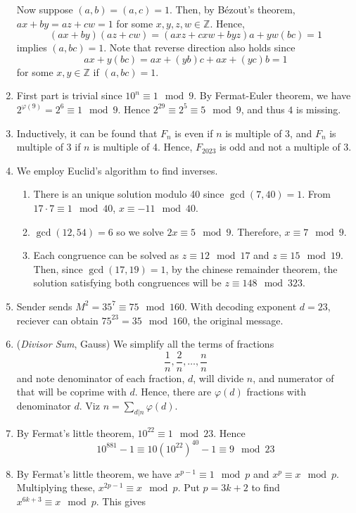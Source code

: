 \documentclass[10pt, a4paper, twoside]{report}
\begin{document}
\begin{enumerate}[{1.}]
    Now suppose \((a,b)=(a,c)=1\). Then, by Bézout's theorem, \(ax+by=az+cw=1\) for some \(x,y,z,w\in\mathbb{Z}\). Hence,
    \[(ax+by)(az+cw)=(axz+cxw+byz)a+yw(bc)=1\]
    implies \((a,bc)=1\). Note that reverse direction also holds since 
    \[ax+y(bc)=ax+(yb)c+ax+(yc)b=1\]
    for some \(x,y\in\mathbb{Z}\) if \((a,bc)=1\).
    \item First part is trivial since \(10^n\equiv 1\mod 9\). By Fermat-Euler theorem, we have \(2^{\varphi(9)}=2^6\equiv 1\mod 9\). Hence \(2^{29}\equiv 2^5\equiv 5\mod 9\), and thus \(4\) is missing.
    \item Inductively, it can be found that \(F_n\) is even if \(n\) is multiple of 3, and \(F_n\) is multiple of 3 if \(n\) is multiple of 4. Hence, \(F_{2023}\) is odd and not a multiple of 3.
    \item We employ Euclid's algorithm to find inverses.
    \begin{enumerate}
        \item There is an unique solution modulo 40 since \(\gcd(7,40)=1\). From \(17\cdot 7\equiv 1\mod 40\), \(x\equiv -11\mod 40\).
        \item \(\gcd(12,54)=6\) so we solve \(2x\equiv 5\mod 9\). Therefore, \(x\equiv 7\mod 9\). 
        \item Each congruence can be solved as \(z\equiv 12\mod 17\) and \(z\equiv 15\mod 19\). Then, since \(\gcd(17,19)=1\), by the chinese remainder theorem, the solution satisfying both congruences will be \(z\equiv 148\mod 323\).
    \end{enumerate}
    \item Sender sends \(M^2=35^7\equiv 75\mod 160\). With decoding exponent \(d=23\), reciever can obtain \(75^{23}=35\mod 160\), the original message.
    \item (\emph{Divisor Sum}, Gauss) We simplify all the terms of fractions 
    \[\frac 1n,\frac 2n,\ldots,\frac nn\]
    and note denominator of each fraction, \(d\), will divide \(n\), and numerator of that will be coprime with \(d\). Hence, there are \(\varphi(d)\) fractions with denominator \(d\). Viz \(n=\sum_{d|n}\varphi(d)\).
    \item By Fermat's little theorem, \(10^{22}\equiv 1\mod 23\). Hence
    \[10^{881}-1\equiv 10(10^{22})^{40}-1\equiv 9\mod 23\]
    \item By Fermat's little theorem, we have \(x^{p-1}\equiv 1\mod p\) and \(x^p\equiv x\mod p\). Multiplying these, \(x^{2p-1}\equiv x\mod p\). Put \(p=3k+2\) to find \(x^{6k+3}\equiv x\mod p\). This gives

\end{enumerate}
\end{document}
